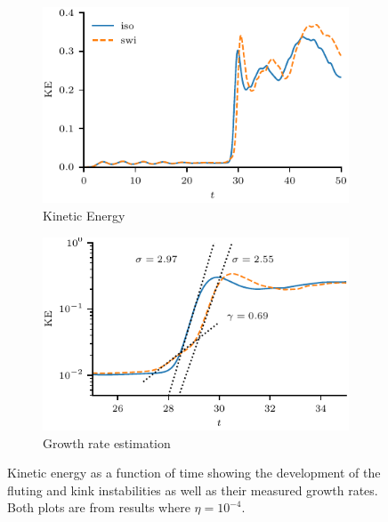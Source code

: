 \begin{figure}[t]
  \centering
    \begin{subfigure}{0.49\textwidth}
      \includegraphics[width=\linewidth]{kinetic_energy-4.pdf}
      \caption{Kinetic Energy}
      \label{fig:kink_ke-4}
    \end{subfigure}
    \hfill
    \begin{subfigure}{0.49\textwidth}
      \includegraphics[width=\linewidth]{kinetic_energy_log-4.pdf}
      \caption{Growth rate estimation}
      \label{fig:kink_ke_log-4}
    \end{subfigure}
\caption{Kinetic energy as a function of time showing the development of the fluting and kink instabilities as well as their measured growth rates. Both plots are from results where $\eta=10^{-4}$.}
\label{fig:kink_str8_ke-4}%
\end{figure}

